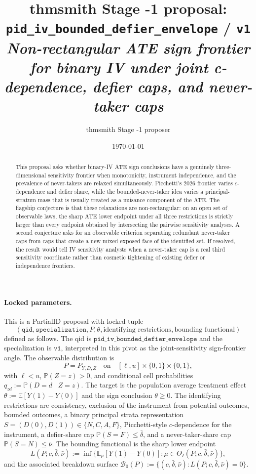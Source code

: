 \documentclass[11pt]{article}
\title{thmsmith Stage -1 proposal: \texttt{pid\_iv\_bounded\_defier\_envelope} / \texttt{v1}%
  \\ \large\textit{Non-rectangular ATE sign frontier for binary IV under joint c-dependence, defier caps, and never-taker caps}}
\author{thmsmith Stage -1 proposer}
\date{\today}
\newcommand{\E}{\mathbb{E}}
\renewcommand{\Pr}{\mathbb{P}}
\theoremstyle{definition}
\theoremstyle{plain}
\theoremstyle{remark}
\begin{document}
\maketitle


\paragraph{Locked parameters.}
This is a PartialID proposal with locked tuple
\[
(\texttt{qid},\texttt{specialization},P,\theta,\text{identifying restrictions},
\text{bounding functional})
\]
defined as follows.  The qid is
\(\texttt{pid\_iv\_bounded\_defier\_envelope}\) and the specialization is
\(\texttt{v1}\), interpreted in this pivot as the joint-sensitivity sign-frontier
angle.  The observable distribution is
\[
  P=P_{Y,D,Z}\quad\text{on}\quad [\ell,u]\times\{0,1\}\times\{0,1\},
\]
with \(\ell<u\), \(\Pr(Z=z)>0\), and conditional cell probabilities
\(q_{zd}:=\Pr(D=d\mid Z=z)\).  The target is the population average treatment
effect \(\theta:=\E[Y(1)-Y(0)]\) and the sign conclusion
\(\theta\ge 0\).  The identifying restrictions are consistency, exclusion of
the instrument from potential outcomes, bounded outcomes, a binary principal
strata representation \(S=(D(0),D(1))\in\{N,C,A,F\}\), Picchetti-style
\(c\)-dependence for the instrument, a defier-share cap
\(\Pr(S=F)\le \bar\delta\), and a never-taker-share cap
\(\Pr(S=N)\le \bar\nu\).  The bounding functional is the sharp lower endpoint
\[
  L(P;c,\bar\delta,\bar\nu)
  :=\inf\{\E_\mu[Y(1)-Y(0)]:\mu\in
  \Theta_I(P;c,\bar\delta,\bar\nu)\},
\]
and the associated breakdown surface
\(\mathcal B_0(P):=\{(c,\bar\delta,\bar\nu):L(P;c,\bar\delta,\bar\nu)=0\}\).

\begin{abstract}
This proposal asks whether binary-IV ATE sign conclusions have a genuinely
three-dimensional sensitivity frontier when monotonicity, instrument
independence, and the prevalence of never-takers are relaxed simultaneously.
Picchetti's 2026 frontier varies \(c\)-dependence and defier share, while the
bounded-never-taker idea varies a principal-stratum mass that is usually treated
as a nuisance component of the ATE.  The flagship conjecture is that these
relaxations are non-rectangular: on an open set of observable laws, the sharp
ATE lower endpoint under all three restrictions is strictly larger than every
endpoint obtained by intersecting the pairwise sensitivity analyses.  A second
conjecture asks for an observable criterion separating redundant never-taker
caps from caps that create a new mixed exposed face of the identified set.  If
resolved, the result would tell IV sensitivity analysts when a never-taker cap
is a real third sensitivity coordinate rather than cosmetic tightening of
existing defier or independence frontiers.
\end{abstract}
\end{document}
